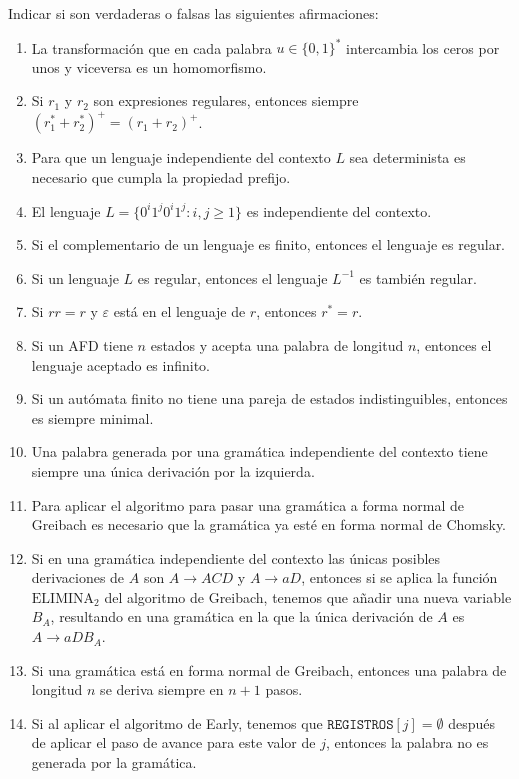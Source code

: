 \documentclass[12pt]{article}
\begin{document}
    \begin{ejercicio}[2.5 puntos]
        Indicar si son verdaderas o falsas las siguientes afirmaciones:
        \begin{enumerate}
            \item La transformación que en cada palabra $u \in \{0, 1\}^*$ intercambia los ceros por unos y viceversa es un homomorfismo.
            \item Si $r_1$ y $r_2$ son expresiones regulares, entonces siempre $(r_1^* + r_2^*)^+ = (r_1 + r_2)^+$.
            \item Para que un lenguaje independiente del contexto $L$ sea determinista es necesario que cumpla la propiedad prefijo.
            \item El lenguaje $L = \{0^{i}1^j0^{i}1^j : i, j \geq 1\}$ es independiente del contexto.
            \item Si el complementario de un lenguaje es finito, entonces el lenguaje es regular.
            \item Si un lenguaje $L$ es regular, entonces el lenguaje $L^{-1}$ es también regular.
            \item Si $rr = r$ y $\varepsilon$ está en el lenguaje de $r$, entonces $r^* = r$.
            \item Si un AFD tiene $n$ estados y acepta una palabra de longitud $n$, entonces el lenguaje aceptado es infinito.
            \item Si un autómata finito no tiene una pareja de estados indistinguibles, entonces es siempre minimal.
            \item Una palabra generada por una gramática independiente del contexto tiene siempre una única derivación por la izquierda.
            \item Para aplicar el algoritmo para pasar una gramática a forma normal de Greibach es necesario que la gramática ya esté en forma normal de Chomsky.
            \item Si en una gramática independiente del contexto las únicas posibles derivaciones de $A$ son $A \to ACD$ y $A \to aD$, entonces si se aplica la función $\text{ELIMINA}_2$ del algoritmo de Greibach, tenemos que añadir una nueva variable $B_A$, resultando en una gramática en la que la única derivación de $A$ es $A \to aDB_A$.
            \item Si una gramática está en forma normal de Greibach, entonces una palabra de longitud $n$ se deriva siempre en $n + 1$ pasos.
            \item Si al aplicar el algoritmo de Early, tenemos que $\texttt{REGISTROS}[j] = \emptyset$ después de aplicar el paso de avance para este valor de $j$, entonces la palabra no es generada por la gramática.
        \end{enumerate}
    \end{ejercicio}
\end{document}
